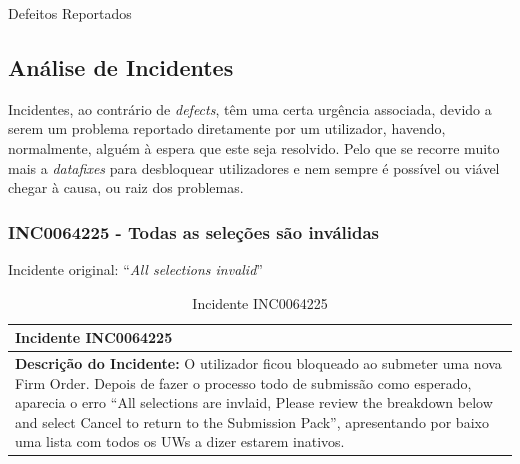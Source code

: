 \begin{table}[htbp]
\begin{tblr}
            \end{tblr}
            \caption{Defeitos Reportados}
            \label{tab:table_reported_defects}
        \end{table}



    \subsection{Análise de Incidentes}\label{sub:incidentes}

        Incidentes, ao contrário de \textit{defects}, têm uma certa urgência associada, devido a serem um problema reportado diretamente por um utilizador, havendo, normalmente, alguém à espera que este seja resolvido. Pelo que se recorre muito mais a \textit{datafixes} para desbloquear utilizadores e nem sempre é possível ou viável chegar à causa, ou raiz dos problemas.


        \subsubsection{INC0064225 - Todas as seleções são inválidas}\label{secsec:inc0064225} %

            Incidente original: ``\textit{All selections invalid}''


            \begin{table}[H] %
                \centering
                \begin{tabularx}{1\textwidth}{|>{\raggedright\arraybackslash}X|}
                    \hline
                    \rowcolor{lightgray}
                    \textbf{Incidente INC0064225} \\
                    \hline
                    \rowcolor{lightgray!20}
                  
                    \textbf{Descrição do Incidente:} O utilizador ficou bloqueado ao submeter uma nova Firm Order. Depois de fazer o processo todo de submissão como esperado, aparecia o erro ``All selections are invlaid, Please review the breakdown below and select Cancel to return to the Submission Pack'', apresentando por baixo uma lista com todos os UWs a dizer estarem inativos.

                    \\
                    \hline
                \end{tabularx}
                \caption{Incidente INC0064225}\label{table:usincINC0064225}
            \end{table}

